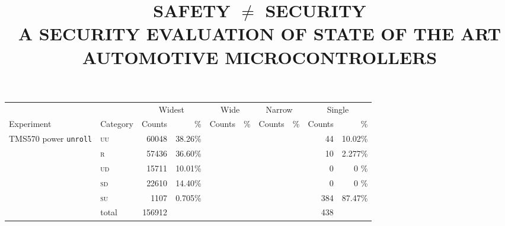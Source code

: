 \documentclass[10pt]{article}
\title{SAFETY $\neq$ SECURITY \\ A SECURITY EVALUATION OF STATE OF THE ART AUTOMOTIVE MICROCONTROLLERS}
\author{}
\date{}
\newcommand{\TI}{TMS570\xspace}
\newcommand{\unroll}{\texttt{unroll}\xspace}
\newcommand{\UU}{\textsc{uu}\xspace}
\newcommand{\UD}{\textsc{ud}\xspace}
\newcommand{\SU}{\textsc{su}\xspace}
\newcommand{\SD}{\textsc{sd}\xspace}
\newcommand{\R}{\textsc{r}\xspace}
\begin{document}

\begin{table}[H]
    \centering
    \begin{tabular}{ll rr rr rr rr}
    \toprule

      &  & \multicolumn{2}{c}{Widest }     &    
           \multicolumn{2}{c}{Wide }      &    
           \multicolumn{2}{c}{Narrow }   &
           \multicolumn{2}{c}{Single }  \\
      Experiment & \multicolumn{1}{c}{Category}  & 
      \multicolumn{1}{c}{Counts}      & \multicolumn{1}{r}{\%}          & 
      \multicolumn{1}{c}{Counts}      & \multicolumn{1}{r}{\%}          & 
      \multicolumn{1}{c}{Counts}      & \multicolumn{1}{r}{\%}          & 
      \multicolumn{1}{c}{Counts}      & \%         \\

    \midrule

    \multicolumn{1}{c}{\multirow{3}{*}{ \parbox{2cm}{\TI power \unroll}}}

    & \UU    
    & 60048  & 38.26\%                   
    & &  
    & &     
    &  44  &  10.02\%   
    \\
    & \R   
    & 57436  & 36.60\%                   
    & &  
    & &     
    &  10  &  2.277\%   
    \\
    & \UD  
    & 15711  & 10.01\%                   
    & &  
    & &     
    &  0   &  0    \%   
    \\
    & \SD     
    & 22610  & 14.40\%                   
    & &  
    & &     
    &  0   &  0    \%   
    \\
    & \SU      
    & 1107   & 0.705\%                   
    & &  
    & &     
    &  384 &  87.47\%   
    \\

    & total    
    & 156912 &                            
    & &  
    & & 
    &  438 &             
    \\       

    \midrule


\end{tabular}
\end{table}
\end{document}
